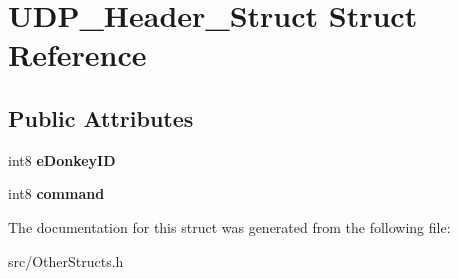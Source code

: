 \section{UDP\_\-Header\_\-Struct Struct Reference}
\label{structUDP__Header__Struct}
\subsection*{Public Attributes}
\begin{DoxyCompactItemize}
\item 
int8 {\bfseries eDonkeyID}\label{structUDP__Header__Struct_aedae8509208cc0eeab5f846319630a4e}

\item 
int8 {\bfseries command}\label{structUDP__Header__Struct_a47cd99813477624c1cc1ea40ee31bbe1}

\end{DoxyCompactItemize}


The documentation for this struct was generated from the following file:\begin{DoxyCompactItemize}
\item 
src/OtherStructs.h\end{DoxyCompactItemize}
